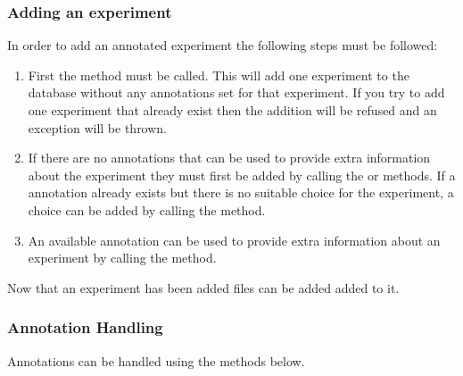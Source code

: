 \subsubsection{Adding an experiment}
In order to add an annotated experiment the following steps must be followed:
\begin{enumerate}
\item First the  method must be called. This will add one experiment to the database without any annotations set for that experiment. If you try to add one experiment that already exist then the addition will be refused and an exception will be thrown.

\item If there are no annotations that can be used to provide extra information about the experiment they must first be added by calling the  or  methods. If a  annotation already exists but there is no suitable choice for the experiment, a choice can be added by calling the  method.

\item An available annotation can be used to provide extra information about an experiment by calling the  method.
\end{enumerate}

Now that an experiment has been added files can be added added to it.

\subsubsection{Annotation Handling}

Annotations can be handled using the methods below.

